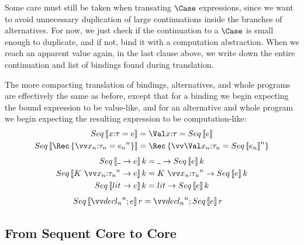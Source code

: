 \documentclass{article}
\begin{document}
Some care must still be taken when transating $\Case$ expressions, since we want
to avoid unnecessary duplication of large continuations inside the branches of
alternatives.  For now, we just check if the continuation to a $\Case$ is small
enough to duplicate, and if not, bind it with a computation abstraction.  When
we reach an apparent value again, in the last clause above, we write down the
entire continuation and list of bindings found during translation.

The more compacting translation of bindings, alternatives, and whole programs
are effectively the same as before, except that for a binding we begin expecting
the bound expression to be value-like, and for an alternative and whole program
we begin expecting the resulting expression to be computation-like:
\begin{align*}
  Seq\trans{\nonrec{\ann x \ty = \expr}}
  &=
  \nonrec{\bindv{\ann x \ty}{Seq\trans{\expr}}}
  \\
  Seq\trans{\rec{\vect[n]{\ann{x_n}{\ty_n} = \expr_n}}}
  &=
  \rec{\vect[n]{\bindv{\ann{x_n}{\ty_n}}{Seq\trans{\expr_n}}}}
\end{align*}
\begin{align*}
  Seq\trans{\blank \to \expr} \ko
  &=
  \blank \to Seq\trans{\expr} \ko
  \\
  Seq\trans{K ~ \vect[n]{\ann{x_n}{\ty_n}} \to \expr} \ko
  &=
  K ~ \vect[n]{\ann{x_n}{\ty_n}}
  \to
  Seq\trans{\expr} \ko
  \\
  Seq\trans{\lit \to \expr} \ko
  &=
  \lit \to Seq\trans{\expr} \ko
\end{align*}
\begin{align*}
  Seq\trans{\vect[n]{\decl_n}; \expr}{r}
  &=
  \vect[n]{\decl_n}; Seq\trans{\expr} r
\end{align*}

\subsection{From Sequent Core to Core}
\end{document}
